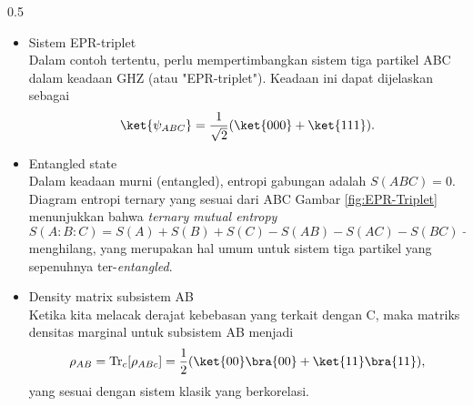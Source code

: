 \begin{frame}
\begin{columns}[T]
   \begin{column}{0.5\textwidth}
        \begin{itemize} \tiny \justifying
            \item[$\Rightarrow$] Sistem EPR-triplet\\
                Dalam contoh tertentu, perlu mempertimbangkan sistem tiga partikel ABC dalam keadaan GHZ (atau "EPR-triplet"). Keadaan ini dapat dijelaskan sebagai 
                    \begin{equation}
                        \ket{\psi_{ABC}}=\frac{1}{\sqrt{2}}(\ket{000}+\ket{111}).
                    \end{equation}
            \item[$\Rightarrow$] Entangled state\\
                Dalam keadaan murni (entangled), entropi gabungan adalah \(S(ABC) = 0\). Diagram entropi ternary yang sesuai dari ABC Gambar \ref{fig:EPR-Triplet} menunjukkan bahwa \textit{ternary mutual entropy} 
                    \begin{equation}
                        S(A:B:C) = S(A)+S(B)+S(C)-S(AB)-S(AC)-S(BC)+S(ABC)
                    \end{equation}
                menghilang, yang merupakan hal umum untuk sistem tiga partikel yang sepenuhnya ter-\textit{entangled}.
            \item[$\Rightarrow$] Density matrix  subsistem AB\\
                Ketika kita melacak derajat kebebasan yang terkait dengan C, maka matriks densitas marginal untuk subsistem AB menjadi
                    \begin{equation}
                        \rho_{AB}=\text{Tr}_c[\rho_{ABc}]=\frac{1}{2}(\ket{00}\bra{00}+\ket{11}\bra{11}),
                    \end{equation} 
                yang sesuai dengan sistem klasik yang berkorelasi.
        \end{itemize}
    \end{column}
  \end{columns}   
\end{frame}

